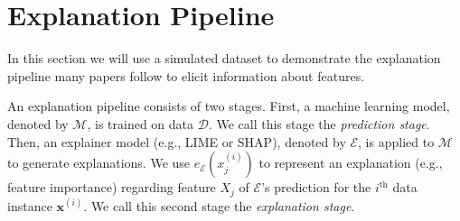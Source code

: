 \documentclass[mnsc,blindrev]{informs3}
\newcommand{\mE}{\mathcal{E}}
\begin{document}

\section{Explanation Pipeline}
    \label{sec:pipeline_demo}
    In this section we will use a simulated dataset to demonstrate the explanation pipeline many papers follow to elicit information about features.
    
An explanation pipeline consists of two stages. First, a machine learning model, denoted by $\mathcal{M}$, is trained on data $\mathcal{D}$. We call this stage the \emph{prediction stage}. Then, an explainer model (e.g., LIME or SHAP), denoted by $\mathcal{E}$, is applied to $\mathcal{M}$ to generate explanations. We use $e_{\mE}(x^{(i)}_j)$ to represent an explanation (e.g., feature importance) regarding feature $X_j$ of $\mE$'s prediction for the $i^{\text{th}}$ data instance $\mathbf{x}^{(i)}$. We call this second stage the \emph{explanation stage}. %
    
\end{document}

